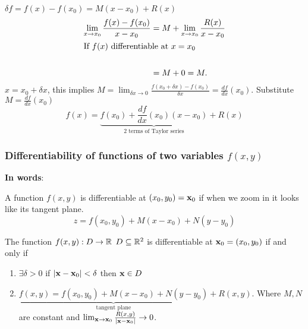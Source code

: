 \documentclass[10pt, a4paper]{article}
\begin{document}
$\delta f = f(x) - f(x_0) = M(x - x_0) + R(x)$
\begin{align*}
    \lim_{x \rightarrow x_0}\frac{f(x) - f(x_0)}{x - x_0} &= M + \lim_{x \rightarrow x_0}\frac{R(x)}{x - x_0} \\
    \intertext{If $f(x)$ differentiable at $x = x_0$} \\
    &= M + 0 = M.
\end{align*}
$x = x_0 + \delta x$,
this implies $M = \lim_{\delta x \rightarrow 0}\frac{f(x_0 + \delta x) - f(x_0)}{\delta x} = \frac{df}{dx}(x_0)$.
Substitute $M = \frac{df}{dx}(x_0)$
\[
f(x) = \underbrace{f(x_0) + \frac{df}{dx}(x_0)(x - x_0)}_{\text{$2$ terms of Taylor series}} + R(x)
\]

\subsubsection{Differentiability of functions of two variables \texorpdfstring{$f(x, y)$}{}}
\textbf{In words}:

A function $f(x, y)$ is differentiable at $(x_0, y_0) = \mathbf{x}_0$ if when we zoom in it looks like its tangent plane.
\[
z = f(x_0, y_0) + M(x - x_0) + N(y - y_0)
\]

\begin{definition}
    The function $f(x, y) : D \rightarrow \mathbb{R}$
    $D \subseteq \mathbb{R} ^ 2$ is differentiable at $\mathbf{x}_0 = (x_0, y_0)$ if and only if
    \begin{enumerate}[label = (\roman*)]
        \item $\exists \delta > 0$ if $|\mathbf{x} - \mathbf{x}_0| < \delta$ then $\mathbf{x} \in D$
        
        \item $\underbrace{f(x, y) = f(x_0, y_0) + M(x - x_0) + N(y - y_0)}_{\text{tangent plane}} + R(x, y)$.
        Where $M, N$ are constant and $\lim_{\mathbf{x} \rightarrow \mathbf{x}_0}\frac{R(x, y)}{|\mathbf{x} - \mathbf{x}_0|} \rightarrow 0$.
    \end{enumerate}
\end{definition}
\end{document}
